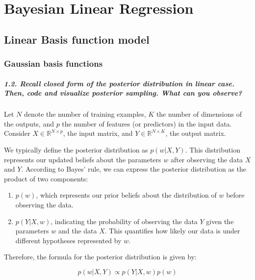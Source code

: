 \graphicspath{{figs/3a}}
\chapter{Bayesian Linear Regression}




\section{Linear Basis function model}
\subsection{Gaussian basis functions}
\paragraph*{1.2. Recall closed form of the posterior distribution in linear case. Then, code and visualize posterior sampling. What can you observe?}

Let $N$ denote the number of training examples, $K$ the number of dimensions of the outputs, and $p$ the number of features (or predictors) in the input data. Consider $X \in \mathbb{R}^{N \times p}$, the input matrix, and $Y \in \mathbb{R}^{N \times K}$, the output matrix. 

We typically define the posterior distribution as $ p(w | X, Y) $. This distribution represents our updated beliefs about the parameters $ w $ after observing the data $ X $ and $ Y $. According to Bayes' rule, we can express the posterior distribution as the product of two components:
\begin{enumerate}
    \item $ p(w) $, which represents our prior beliefs about the distribution of $ w $ before observing the data.
    \item $ p(Y | X, w) $, indicating the probability of observing the data $ Y $ given the parameters $ w $ and the data $ X $. This quantifies how likely our data is under different hypotheses represented by $ w $.
\end{enumerate}
    
Therefore, the formula for the posterior distribution is given by:

\[ p(w | X, Y) \propto p(Y | X, w) p(w) \]


